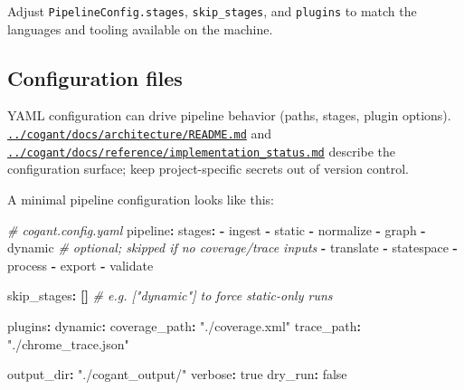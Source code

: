 \documentclass[
]{article}
\newenvironment{Shaded}{}{}
\newcommand{\AttributeTok}[1]{\textcolor[rgb]{0.49,0.56,0.16}{#1}}
\newcommand{\CharTok}[1]{\textcolor[rgb]{0.25,0.44,0.63}{#1}}
\newcommand{\CommentTok}[1]{\textcolor[rgb]{0.38,0.63,0.69}{\textit{#1}}}
\newcommand{\FunctionTok}[1]{\textcolor[rgb]{0.02,0.16,0.49}{#1}}
\newcommand{\KeywordTok}[1]{\textcolor[rgb]{0.00,0.44,0.13}{\textbf{#1}}}
\newcommand{\StringTok}[1]{\textcolor[rgb]{0.25,0.44,0.63}{#1}}
\begin{document}
Adjust \texttt{PipelineConfig.stages}, \texttt{skip\_stages}, and
\texttt{plugins} to match the languages and tooling available on the
machine.

\subsection{Configuration files}\label{configuration-files-1}

YAML configuration can drive pipeline behavior (paths, stages, plugin
options).
\href{../cogant/docs/architecture/README.md}{\texttt{../cogant/docs/architecture/README.md}}
and
\href{../cogant/docs/reference/implementation_status.md}{\texttt{../cogant/docs/reference/implementation\_status.md}}
describe the configuration surface; keep project-specific secrets out of
version control.

A minimal pipeline configuration looks like this:

\begin{Shaded}
\begin{Highlighting}[]
\CommentTok{\# cogant.config.yaml}
\FunctionTok{pipeline}\KeywordTok{:}
\AttributeTok{  }\FunctionTok{stages}\KeywordTok{:}
\AttributeTok{    }\KeywordTok{{-}}\AttributeTok{ ingest}
\AttributeTok{    }\KeywordTok{{-}}\AttributeTok{ static}
\AttributeTok{    }\KeywordTok{{-}}\AttributeTok{ normalize}
\AttributeTok{    }\KeywordTok{{-}}\AttributeTok{ graph}
\AttributeTok{    }\KeywordTok{{-}}\AttributeTok{ dynamic}\CommentTok{       \# optional; skipped if no coverage/trace inputs}
\AttributeTok{    }\KeywordTok{{-}}\AttributeTok{ translate}
\AttributeTok{    }\KeywordTok{{-}}\AttributeTok{ statespace}
\AttributeTok{    }\KeywordTok{{-}}\AttributeTok{ process}
\AttributeTok{    }\KeywordTok{{-}}\AttributeTok{ export}
\AttributeTok{    }\KeywordTok{{-}}\AttributeTok{ validate}

\AttributeTok{  }\FunctionTok{skip\_stages}\KeywordTok{:}\AttributeTok{ }\KeywordTok{[]}\CommentTok{   \# e.g. ["dynamic"] to force static{-}only runs}

\AttributeTok{  }\FunctionTok{plugins}\KeywordTok{:}
\AttributeTok{    }\FunctionTok{dynamic}\KeywordTok{:}
\AttributeTok{      }\FunctionTok{coverage\_path}\KeywordTok{:}\AttributeTok{ }\StringTok{"./coverage.xml"}
\AttributeTok{      }\FunctionTok{trace\_path}\KeywordTok{:}\AttributeTok{ }\StringTok{"./chrome\_trace.json"}

\AttributeTok{  }\FunctionTok{output\_dir}\KeywordTok{:}\AttributeTok{ }\StringTok{"./cogant\_output/"}
\AttributeTok{  }\FunctionTok{verbose}\KeywordTok{:}\AttributeTok{ }\CharTok{true}
\AttributeTok{  }\FunctionTok{dry\_run}\KeywordTok{:}\AttributeTok{ }\CharTok{false}
\end{Highlighting}
\end{Shaded}
\end{document}
